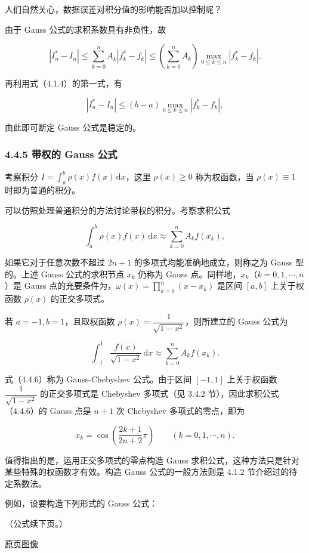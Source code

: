 \documentclass[
  10pt,
  fontset=fandol]{ctexart}
\begin{document}
人们自然关心，数据误差对积分值的影响能否加以控制呢？

由于 Gauss 公式的求积系数具有非负性，故

\[
|I_n^*-I_n|\leq\sum_{k=0}^{n}A_k|f_k^*-f_k|
\leq\left(\sum_{k=0}^{n}A_k\right)\max_{0\leq k\leq n}|f_k^*-f_k|.
\]

再利用式（4.1.4）的第一式，有

\[
|I_n^*-I_n|\leq(b-a)\max_{0\leq k\leq n}|f_k^*-f_k|,
\]

由此即可断定 Gauss 公式是稳定的。

\subsubsection{4.4.5 带权的 Gauss 公式}\label{ux5e26ux6743ux7684-gauss-ux516cux5f0f}

考察积分 \(\displaystyle I=\int_a^b\rho(x)f(x)\,\mathrm{d}x\)，这里 \(\rho(x)\geq0\) 称为权函数，当 \(\rho(x)\equiv1\) 时即为普通的积分。

可以仿照处理普通积分的方法讨论带权的积分。考察求积公式

\[
\int_a^b\rho(x)f(x)\,\mathrm{d}x\approx\sum_{k=0}^{n}A_kf(x_k),
\]

如果它对于任意次数不超过 \(2n+1\) 的多项式均能准确地成立，则称之为 Gauss 型的。上述 Gauss 公式的求积节点 \(x_k\) 仍称为 Gauss 点。同样地，\(x_k\)（\(k=0,1,\cdots,n\)）是 Gauss 点的充要条件为，\(\displaystyle\omega(x)=\prod_{k=0}^{n}(x-x_k)\) 是区间 \([a,b]\) 上关于权函数 \(\rho(x)\) 的正交多项式。

若 \(a=-1,b=1\)，且取权函数 \(\rho(x)=\dfrac1{\sqrt{1-x^2}}\)，则所建立的 Gauss 公式为

\[
\int_{-1}^{1}\frac{f(x)}{\sqrt{1-x^2}}\,\mathrm{d}x
\approx\sum_{k=0}^{n}A_kf(x_k).
\tag{4.4.6}
\]

式（4.4.6）称为 Gauss-Chebyshev 公式。由于区间 \([-1,1]\) 上关于权函数 \(\dfrac1{\sqrt{1-x^2}}\) 的正交多项式是 Chebyshev 多项式（见 3.4.2 节），因此求积公式（4.4.6）的 Gauss 点是 \(n+1\) 次 Chebyshev 多项式的零点，即为

\[
x_k=\cos\left(\frac{2k+1}{2n+2}\pi\right)\qquad(k=0,1,\cdots,n).
\]

值得指出的是，运用正交多项式的零点构造 Gauss 求积公式，这种方法只是针对某些特殊的权函数才有效。构造 Gauss 公式的一般方法则是 4.1.2 节介绍过的待定系数法。

例如，设要构造下列形式的 Gauss 公式：

（公式续下页。）

\href{../../source-images/pdf-111.jpeg}{原页图像}
\end{document}
